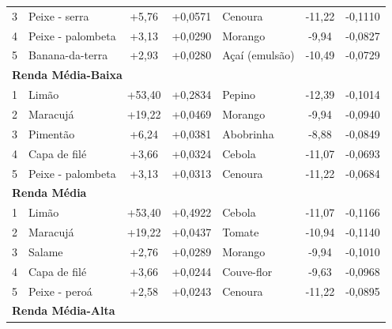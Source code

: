 \documentclass[10pt,a4paper]{article}
\begin{document}
\begin{table}[htbp]
\begin{tabular*}{\textwidth}{@{\extracolsep{\fill}} c l c c | l c c @{}}
			3 & Peixe - serra & +5,76 & +0,0571 & Cenoura & -11,22 & -0,1110 \\
			
			4 & Peixe - palombeta & +3,13 & +0,0290 & Morango & -9,94 & -0,0827 \\
			
			5 & Banana-da-terra & +2,93 & +0,0280 & Açaí (emulsão) & -10,49 & -0,0729 \\
			
			\midrule
			
			\multicolumn{7}{l}{\textbf{\color{bisnavy}Renda Média-Baixa}} \\
			\midrule
			
			1 & Limão & +53,40 & +0,2834 & Pepino & -12,39 & -0,1014 \\
			
			2 & Maracujá & +19,22 & +0,0469 & Morango & -9,94 & -0,0940 \\
			
			3 & Pimentão & +6,24 & +0,0381 & Abobrinha & -8,88 & -0,0849 \\
			
			4 & Capa de filé & +3,66 & +0,0324 & Cebola & -11,07 & -0,0693 \\
			
			5 & Peixe - palombeta & +3,13 & +0,0313 & Cenoura & -11,22 & -0,0684 \\
			
			\midrule
			
			\multicolumn{7}{l}{\textbf{\color{bisnavy}Renda Média}} \\
			\midrule
			
			1 & Limão & +53,40 & +0,4922 & Cebola & -11,07 & -0,1166 \\
			
			2 & Maracujá & +19,22 & +0,0437 & Tomate & -10,94 & -0,1140 \\
			
			3 & Salame & +2,76 & +0,0289 & Morango & -9,94 & -0,1010 \\
			
			4 & Capa de filé & +3,66 & +0,0244 & Couve-flor & -9,63 & -0,0968 \\
			
			5 & Peixe - peroá & +2,58 & +0,0243 & Cenoura & -11,22 & -0,0895 \\
			
			\midrule
			
			\multicolumn{7}{l}{\textbf{\color{bisnavy}Renda Média-Alta}} \\
			\midrule
			

\end{tabular*}
\end{table}
\end{document}
